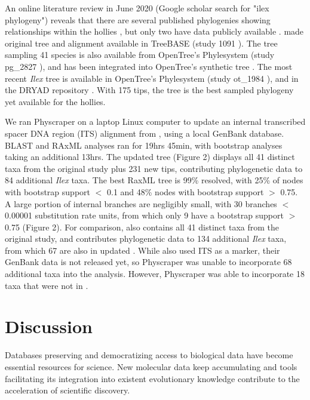 \documentclass{bmcart}
\begin{document}
An online literature review in June 2020 (Google scholar search for "ilex phylogeny")
reveals that there are several published phylogenies showing relationships within
the hollies \cite{cuenoud2000molecular, manen2010history, setoguchi2000intersectional,
selbach2009new}, but only two have data publicly available \cite{gottlieb2005molecular, yao2020phylogeny}.
\cite{gottlieb2005molecular} made original tree and alignment available in TreeBASE
(study 1091 \cite{treebase1091}). The tree sampling 41 species is also available from
OpenTree's Phylesystem (study pg\_2827 \cite{pg2827}),
and has been integrated into OpenTree's synthetic tree \cite{mrcaott68451ott89474}.
The most recent \textit{Ilex} tree \cite{yao2020phylogeny} is available in
OpenTree's Phylesystem (study ot\_1984 \cite{ot1984}),
and in the DRYAD repository \cite{yao2020dryad}.
With 175 tips, the \cite{yao2020phylogeny} tree is the best sampled phylogeny yet available for
the hollies.

We ran Physcraper on a laptop Linux computer to update an internal transcribed
spacer DNA region (ITS) alignment from \cite{gottlieb2005molecular}, using a local
GenBank database.  BLAST and RAxML analyses ran for 19hrs 45min, with bootstrap
analyses taking an additional 13hrs.
The updated \cite{gottlieb2005molecular} tree (Figure 2) displays
all 41 distinct
taxa from the original study plus 231 new tips, contributing phylogenetic data to
84 additional \textit{Ilex} taxa. The best RaxML tree is 99\% resolved, with 25\% of nodes
with bootstrap support $<$ 0.1 and 48\% nodes with bootstrap support $>$ 0.75.
A large portion of internal branches are negligibly small, with 30 branches
$<$ 0.00001 substitution rate units, from which only 9 have a bootstrap support $>$ 0.75
(Figure 2).
For comparison, \cite{yao2020phylogeny} also contains all 41 distinct taxa from
the original
\cite{gottlieb2005molecular} study,
and contributes phylogenetic data to 134 additional \textit{Ilex} taxa, from which
67 are also in updated \cite{gottlieb2005molecular}. While \cite{yao2020phylogeny} also used
ITS as a marker, their GenBank data is not released yet, so Physcraper was unable
to incorporate 68 additional taxa into the analysis. However, Physcraper was able
to incorporate 18 taxa that were not in \cite{yao2020phylogeny}.

\section*{Discussion}
Databases preserving and democratizing access to biological data
have become essential resources for science.
New molecular data keep accumulating and tools facilitating its integration into
existent evolutionary knowledge contribute to the acceleration of scientific discovery.
\end{document}
